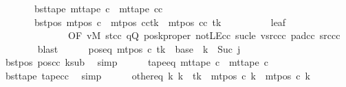 \begin{isabellebody}
\ \ \ \ \ \ \ bst{\isacharunderscore}{\kern0pt}tape{\isacharcolon}{\kern0pt}\ {\isachardoublequoteopen}mt{\isacharunderscore}{\kern0pt}tape\ c{\isacharprime}{\kern0pt}{\isacharprime}{\kern0pt}\ {\isacharequal}{\kern0pt}\ mt{\isacharunderscore}{\kern0pt}tape\ cc{\isachardoublequoteclose}\isanewline
\ \ \ \ \ \ \ bst{\isacharunderscore}{\kern0pt}pos{\isacharcolon}{\kern0pt}\ {\isachardoublequoteopen}mt{\isacharunderscore}{\kern0pt}pos\ c{\isacharprime}{\kern0pt}{\isacharprime}{\kern0pt}\ {\isacharequal}{\kern0pt}\ {\isacharparenleft}{\kern0pt}mt{\isacharunderscore}{\kern0pt}pos\ cc{\isacharparenright}{\kern0pt}{\isacharparenleft}{\kern0pt}tk\ {\isacharcolon}{\kern0pt}{\isacharequal}{\kern0pt}\ mt{\isacharunderscore}{\kern0pt}pos\ cc\ tk\ {\isacharminus}{\kern0pt}\ {}{\isacharparenright}{\kern0pt}{\isachardoublequoteclose}\isanewline
\ \ \ \ \ \ \isamarkupfalse%
\ leaf\isanewline
\ \ \ \ \ \ \ \ \ \ \ \ \ \ {\isacharbrackleft}{\kern0pt}OF\ vM\ st{\isacharunderscore}{\kern0pt}cc\ qQ\ poskproper\ notLE{\isacharunderscore}{\kern0pt}cc\ suc{\isacharunderscore}{\kern0pt}le\ vsrc{\isacharunderscore}{\kern0pt}cc\ pad{\isacharunderscore}{\kern0pt}cc\ src{\isacharunderscore}{\kern0pt}cc{\isacharbrackright}{\kern0pt}\isanewline
\ \ \ \ \ \ \isamarkupfalse%
\ blast\isanewline
\ \ \ \ \isamarkupfalse%
\ pos{\isacharunderscore}{\kern0pt}eq{\isacharcolon}{\kern0pt}\ {\isachardoublequoteopen}mt{\isacharunderscore}{\kern0pt}pos\ c{\isacharprime}{\kern0pt}{\isacharprime}{\kern0pt}\ tk\ {\isacharequal}{\kern0pt}\ base\ {\isacharplus}{\kern0pt}\ {\isacharparenleft}{\kern0pt}{\isacharquery}{\kern0pt}k\ {\isacharminus}{\kern0pt}\ Suc\ j{\isacharparenright}{\kern0pt}{\isachardoublequoteclose}\isanewline
\ \ \ \ \ \ \isamarkupfalse%
\ bst{\isacharunderscore}{\kern0pt}pos\ pos{\isacharunderscore}{\kern0pt}cc\ ksub\ \isamarkupfalse%
\ simp\isanewline
\ \ \ \ \isamarkupfalse%
\ tape{\isacharunderscore}{\kern0pt}eq{\isacharcolon}{\kern0pt}\ {\isachardoublequoteopen}mt{\isacharunderscore}{\kern0pt}tape\ c{\isacharprime}{\kern0pt}{\isacharprime}{\kern0pt}\ {\isacharequal}{\kern0pt}\ mt{\isacharunderscore}{\kern0pt}tape\ c{}{\isachardoublequoteclose}\ \isamarkupfalse%
\ bst{\isacharunderscore}{\kern0pt}tape\ tape{\isacharunderscore}{\kern0pt}cc\ \isamarkupfalse%
\ simp\isanewline
\ \ \ \ \isamarkupfalse%
\ other{\isacharunderscore}{\kern0pt}eq{\isacharcolon}{\kern0pt}\ {\isachardoublequoteopen}{\isasymforall}k{\isacharprime}{\kern0pt}{\isachardot}{\kern0pt}\ k{\isacharprime}{\kern0pt}\ {\isasymnoteq}\ tk\ {\isasymlongrightarrow}\ mt{\isacharunderscore}{\kern0pt}pos\ c{\isacharprime}{\kern0pt}{\isacharprime}{\kern0pt}\ k{\isacharprime}{\kern0pt}\ {\isacharequal}{\kern0pt}\ mt{\isacharunderscore}{\kern0pt}pos\ c{}\ k{\isacharprime}{\kern0pt}{\isachardoublequoteclose}\isanewline

\end{isabellebody}
